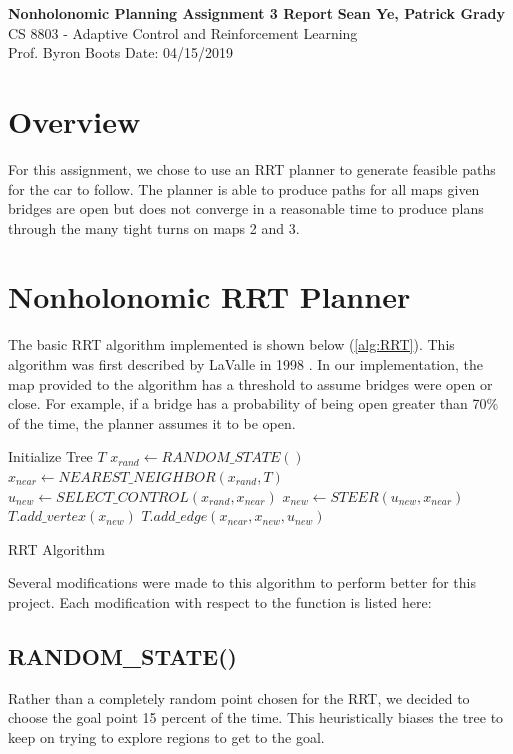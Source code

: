 \documentclass[a4paper, 11pt]{article}
\begin{document}
\noindent
\large\textbf{Nonholonomic Planning Assignment 3 Report} \hfill \textbf{Sean Ye, Patrick Grady} \\
\normalsize CS 8803 - Adaptive Control and Reinforcement Learning \\
Prof. Byron Boots \hfill Date: 04/15/2019 \\

\section{Overview}

For this assignment, we chose to use an RRT planner to generate feasible paths for the car to follow. The planner is able to produce paths for all maps given bridges are open but does not converge in a reasonable time to produce plans through the many tight turns on maps 2 and 3.

\section{Nonholonomic RRT Planner}

The basic RRT algorithm implemented is shown below (\ref{alg:RRT}). This algorithm was first described by LaValle in 1998 \cite{Lavalle98}. In our implementation, the map provided to the algorithm has a threshold to assume bridges were open or close. For example, if a bridge has a probability of being open greater than 70\% of the time, the planner assumes it to be open.

\begin{algorithm}[H]
    \begin{algorithmic}
    \State Initialize Tree $T$
    		\State $x_{rand} \leftarrow RANDOM\_STATE()$
    		\State $x_{near} \leftarrow NEAREST\_NEIGHBOR(x_{rand}, T)$
    		\State $u_{new} \leftarrow SELECT\_CONTROL(x_{rand}, x_{near})$
    		\State $x_{new} \leftarrow STEER(u_{new}, x_{near})$
    		\State $T.add\_vertex(x_{new})$
    		\State $T.add\_edge(x_{near}, x_{new}, u_{new})$
	\EndWhile    	
    \end{algorithmic}
\caption{RRT Algorithm}
\label{alg:RRT}
\end{algorithm}

Several modifications were made to this algorithm to perform better for this project. Each modification with respect to the function is listed here:

\subsection{RANDOM\_STATE()}
Rather than a completely random point chosen for the RRT, we decided to choose the goal point 15 percent of the time. This heuristically biases the tree to keep on trying to explore regions to get to the goal.
\end{document}
